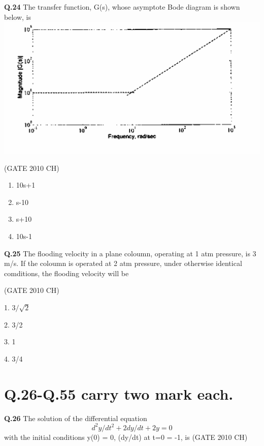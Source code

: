 \documentclass[journal,12pt,onecolumn]{exam}
\theoremstyle{remark}
\begin{document}
  \noindent
  \textbf{Q.24}
   The transfer function, G(s), whose asymptote Bode diagram is shown below, is\\
  \includegraphics[width=1.0\linewidth]{images/Q.24 image.png}
      
    
 \hfill{(GATE 2010 CH)}\\


   \begin{enumerate}
       \item 10s+1
       \item s-10
       \item s+10
       \item 10s-1
   \end{enumerate}


   \noindent
   \textbf{Q.25}
   The flooding velocity in a plane coloumn, operating at 1 atm pressure, is 3 m/s. If the coloumn is operated at 2 atm pressure, under otherwise identical comditions, the flooding velocity will be
   
\hfill{(GATE 2010 CH)}\\


  \item 1. $3/\sqrt{2}$\\
  \item 2. 3/2\\
  \item 3. 1\\
  \item 4. 3/4\\   

 
  
  \section{Q.26-Q.55 carry two mark each.}

  \noindent
  \textbf{Q.26}
   The solution of the differential equation
   \begin{equation}
       d^2y/dt^2 + 2dy/dt + 2y = 0
   \end{equation}
   with the initial conditions y(0) = 0, (dy/dt) at t=0 = -1, is
\hfill{(GATE 2010 CH)}\\
\end{document}
